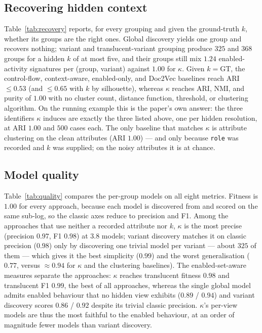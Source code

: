 \documentclass[10pt]{article}
\begin{document}
\subsection{Recovering hidden context}
\label{sec:recovery}
Table~\ref{tab:recovery} reports, for every grouping and given the ground-truth $k$, whether its groups are the right ones.
Global discovery yields one group and recovers nothing; variant and translucent-variant grouping produce $325$ and $368$ groups for a hidden $k$ of at most five, and their groups still mix $1.24$ enabled-activity signatures per (group, variant) against $1.00$ for $\kappa$.
Given $k=\mathrm{GT}$, the control-flow, context-aware, enabled-only, and Doc2Vec baselines reach ARI $\le 0.53$ (and $\le 0.65$ with $k$ by silhouette), whereas $\kappa$ reaches ARI, NMI, and purity of $1.00$ with no cluster count, distance function, threshold, or clustering algorithm.
On the running example this is the paper's own answer: the three identifiers $\kappa$ induces are exactly the three listed above, one per hidden resolution, at ARI $1.00$ and $500$ cases each.
The only baseline that matches $\kappa$ is attribute clustering on the clean attributes (ARI $1.00$) --- and only because \texttt{role} was recorded and $k$ was supplied; on the noisy attributes it is at chance.

\begin{table}[t]
  \centering
  \caption{Recovering the hidden context: ARI / NMI / purity against the hidden label, and enabled-signature incoherence, for every grouping. \emph{GT} / \emph{auto} $=$ $k$ set to the true view count / chosen by silhouette. Mean over the nine logs and three seeds; the best value in each column is in \textbf{bold}.}
  \label{tab:recovery}
  \footnotesize\setlength{\tabcolsep}{5pt}
  
\end{table}

\subsection{Model quality}
\label{sec:quality}
Table~\ref{tab:quality} compares the per-group models on all eight metrics.
Fitness is $1.00$ for every approach, because each model is discovered from and scored on the same sub-log, so the classic axes reduce to precision and F1.
Among the approaches that use neither a recorded attribute nor $k$, $\kappa$ is the most precise (precision $0.97$, F1 $0.98$) at $3.8$ models; variant discovery matches it on classic precision ($0.98$) only by discovering one trivial model per variant --- about $325$ of them --- which gives it the best simplicity ($0.99$) and the worst generalisation ($0.77$, versus $\approx0.94$ for $\kappa$ and the clustering baselines).
The enabled-set-aware measures separate the approaches: $\kappa$ reaches translucent fitness $0.98$ and translucent F1 $0.99$, the best of all approaches, whereas the single global model admits enabled behaviour that no hidden view exhibits ($0.89$ / $0.94$) and variant discovery scores $0.86$ / $0.92$ despite its trivial classic precision.
$\kappa$'s per-view models are thus the most faithful to the enabled behaviour, at an order of magnitude fewer models than variant discovery.
\end{document}
